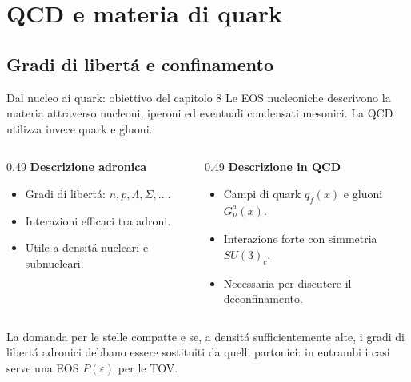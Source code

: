 \section{QCD e materia di quark}

\subsection{Gradi di libert\'a e confinamento}

\begin{frame}{Dal nucleo ai quark: obiettivo del capitolo 8}
\small
Le EOS nucleoniche descrivono la materia attraverso nucleoni, iperoni
ed eventuali condensati mesonici. La QCD utilizza invece quark e gluoni.
\begin{columns}[T,onlytextwidth]
\begin{column}{0.49\textwidth}
\textbf{Descrizione adronica}
\begin{itemize}
\item Gradi di libert\'a: $n,p,\Lambda,\Sigma,\ldots$.
\item Interazioni efficaci tra adroni.
\item Utile a densit\'a nucleari e subnucleari.
\end{itemize}
\end{column}
\begin{column}{0.49\textwidth}
\textbf{Descrizione in QCD}
\begin{itemize}
\item Campi di quark $q_f(x)$ e gluoni $G_\mu^a(x)$.
\item Interazione forte con simmetria $SU(3)_c$.
\item Necessaria per discutere il deconfinamento.
\end{itemize}
\end{column}
\end{columns}
\medskip
La domanda per le stelle compatte e se, a densit\'a sufficientemente
alte, i gradi di libert\'a adronici debbano essere sostituiti da quelli
partonici: in entrambi i casi serve una EOS $P(\varepsilon)$ per le TOV.
\end{frame}

